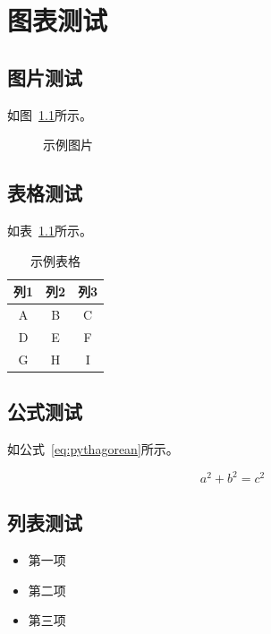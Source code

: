 \documentclass[degree=bachelor]{sduthesis}
\begin{document}
\chapter{图表测试}

\section{图片测试}

如图~\ref{fig:example}所示。

\begin{figure}[htbp]
  \centering
  \caption{示例图片}
  \label{fig:example}
\end{figure}

\section{表格测试}

如表~\ref{tab:example}所示。

\begin{table}[htbp]
  \centering
  \caption{示例表格}
  \label{tab:example}
  \begin{tabular}{ccc}
    \toprule
    列1 & 列2 & 列3 \\
    \midrule
    A & B & C \\
    D & E & F \\
    G & H & I \\
    \bottomrule
  \end{tabular}
\end{table}

\section{公式测试}

如公式~\ref{eq:pythagorean}所示。

\begin{equation}
  \label{eq:pythagorean}
  a^2 + b^2 = c^2
\end{equation}

\section{列表测试}

\begin{itemize}
  \item 第一项
  \item 第二项
  \item 第三项
\end{itemize}
\end{document}

